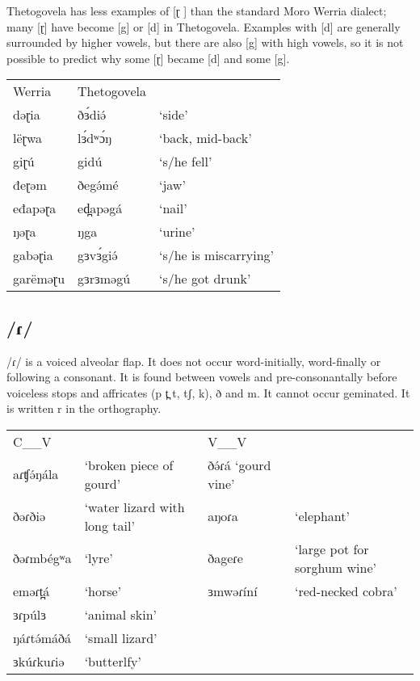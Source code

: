Thetogovela has less examples of [ɽ ] than the standard Moro Werria dialect; many [ɽ] have become [g] or [d] in Thetogovela. Examples with [d] are generally surrounded by higher vowels, but there are also [g] with high vowels, so it is not possible to predict why some [ɽ] became [d] and some [g]. 

\ea 	
\begin{tabular}[t]{lll}
	Werria 	&Thetogovela	\\
	dəɽia	&ðɜ́diə́		&‘side’\\
	lëɽwa	&lɜ́dʷɔ́ŋ		&‘back, mid-back’\\
	giɽú	&gidú		&‘s/he fell’\\
	đeɽəm	&ðegə́mé		&‘jaw’\\
	eđapəɽa	&ed̪apəgá	&‘nail’\\
	ŋəɽa	&ŋga		&‘urine’\\
	gabəɽia	&gɜvɜ́giə́		&‘s/he is miscarrying’\\
	garëməɽu	&gɜrɜməgú	&‘s/he got drunk’\\
\end{tabular}\label{ex:ch2:38}
\z


\subsection{/ɾ/}
/ɾ/ is a voiced alveolar flap. It does not occur word-initially, word-finally or following a consonant. It is found between vowels and pre-consonantally before voiceless stops and affricates  (p t̪ t, tʃ, k), ð and m. It cannot occur geminated. It is written r in the orthography.

\ea 
\begin{tabular}[t]{lp{3cm}lp{3cm}}
C\_\_V	&&		V\_\_V	\\
aɾʧə́ŋála	&‘broken piece of gourd’		&ðə́ɾá	‘gourd vine’\\
ðəɾðiə	&‘water lizard with long tail’		&aŋoɾa	&‘elephant’\\
ðəɾmbégʷa	&‘lyre’		&ðageɾe	&‘large pot for sorghum wine’\\
eməɾt̪á	&‘horse’		&ɜmwəɾíní	&‘red-necked cobra’\\
ɜɾpúlɜ	&‘animal skin’			\\
ŋáɾtə́máðá	&‘small lizard’			\\
ɜkúɾkuɾiə	&‘butterlfy’	
\end{tabular}\label{ex:ch2:39}
\z 		


